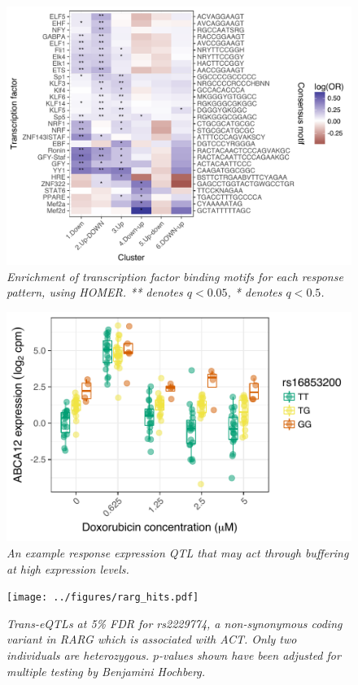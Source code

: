 \documentclass{article}
\begin{document}
\begin{figure}[h]
\begin{center}
    \includegraphics[width=1\textwidth]{../figures/cluster_tf.pdf} %
    \caption{\it{Enrichment of transcription factor binding motifs for each response pattern, using HOMER. ** denotes $q<0.05$, * denotes $q<0.5$.}}
    \label{fig:tf}
    \end{center}
\end{figure}

\begin{figure}[h]
\begin{center}
    \includegraphics[width=.6\textwidth]{../figures/ABCA12.pdf} %
    \caption{\it{An example response expression QTL that may act through buffering at high expression levels.}}
    \label{fig:ABCA12}
    \end{center}
\end{figure}


\begin{figure}[h]
\begin{center}
    \texttt{[image: ../figures/rarg\_hits.pdf]} 
    \caption{\it{Trans-eQTLs at 5\% FDR for rs2229774, a non-synonymous coding variant in \emph{RARG} which is associated with ACT\cite{Aminkeng2015}. Only two individuals are heterozygous. $p$-values shown have been adjusted for multiple testing by Benjamini Hochberg.}}
    \label{fig:rarg_hits}
    \end{center}
\end{figure}
\end{document}
